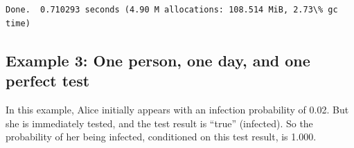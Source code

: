 \documentclass[11pt]{article}
\begin{document}
    \begin{center}
    \end{center}
    { \hspace*{\fill} \\}
    
    \begin{Verbatim}[commandchars=\\\{\}]

Done.  0.710293 seconds (4.90 M allocations: 108.514 MiB, 2.73\% gc time)
    \end{Verbatim}
\newpage
    \hypertarget{example-3-one-person-one-day-and-one-perfect-test}{%
\subsection{Example 3: One person, one day, and one perfect
test}\label{example-3-one-person-one-day-and-one-perfect-test}}

In this example, Alice initially appears with an infection probability
of 0.02. But she is immediately tested, and the test result is ``true''
(infected). So the probability of her being infected, conditioned on
this test result, is 1.000.
\end{document}
